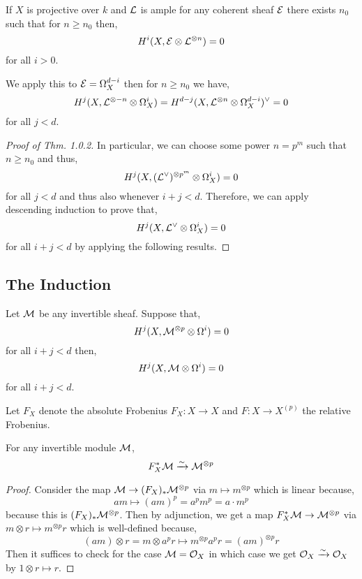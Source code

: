 \documentclass[12pt]{article}
\begin{document}
\begin{thm}
If $X$ is projective over $k$ and $\mathcal{L}$ is ample for any coherent sheaf $\mathcal{E}$ there exists $n_0$ such that for $n \ge n_0$ then,
\[ H^i(X, \mathcal{E} \otimes \mathcal{L}^{\otimes n}) = 0 \]
for all $i > 0$.
\end{thm}

\begin{rmk}
We apply this to $\mathcal{E} = \Omega_X^{d-i}$ then for $n \ge n_0$ we have,
\[ H^{j}(X, \mathcal{L}^{\otimes -n} \otimes \Omega_X^{i}) = H^{d-j}(X, \mathcal{L}^{\otimes n} \otimes \Omega_X^{d-i})^\vee = 0 \]
for all $j < d$.
\end{rmk}

\begin{proof}[Proof of Thm. 1.0.2]
In particular, we can choose some power $n = p^m$ such that $n \ge n_0$ and thus,
\[ H^j(X, (\mathcal{L}^\vee)^{\otimes p^m} \otimes \Omega^i_X) = 0 \]
for all $j < d$ and thus also whenever $i + j < d$. Therefore, we can apply descending induction to prove that,
\[ H^j(X, \mathcal{L}^\vee \otimes \Omega^i_X) = 0 \]
for all $i + j < d$ by applying the following results.
\end{proof}

\subsection{The Induction}

\begin{prop}
Let $\mathcal{M}$ be any invertible sheaf. Suppose that,
\[ H^j(X, \mathcal{M}^{\otimes p} \otimes \Omega^i) = 0 \] 
for all $i + j < d$ then,
\[ H^j(X, \mathcal{M} \otimes \Omega^i) = 0 \]
for all $i + j < d$.
\end{prop}

\begin{rmk}
Let $F_X$ denote the absolute Frobenius $F_X : X \to X$ and $F : X \to X^{(p)}$ the relative Frobenius.
\end{rmk}

\begin{lemma}
For any invertible module $\mathcal{M}$,
\[ F_X^* \mathcal{M} \xrightarrow{\sim} \mathcal{M}^{\otimes p} \]
\end{lemma}

\begin{proof}
Consider the map $\mathcal{M} \to (F_X)_* \mathcal{M}^{\otimes p}$ via $m \mapsto m^{\otimes p}$ which is linear because,
\[ am \mapsto (am)^p = a^p m^p = a \cdot m^p \]
because this is $(F_X)_* \mathcal{M}^{\otimes p}$. Then by adjunction, we get a map $F_X^* \mathcal{M} \to \mathcal{M}^{\otimes p}$ via $m \otimes r \mapsto m^{\otimes p} r$ which is well-defined because,
\[ (am) \otimes r = m \otimes a^p r \mapsto m^{\otimes p} a^p r = (am)^{\otimes p} r  \] 
Then it suffices to check for the case $\mathcal{M} = \mathcal{O}_{X}$ in which case we get $\mathcal{O}_{X} \xrightarrow{\sim} \mathcal{O}_{X}$ by $1 \otimes r \mapsto r$.
\end{proof}
\end{document}

